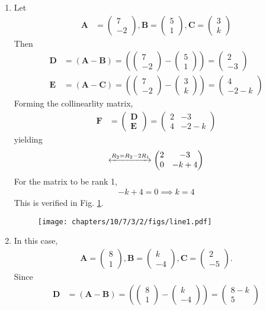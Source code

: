 \documentclass[journal,10pt,twocolumn]{article}
\newcommand{\myvec}[1]{\ensuremath{\begin{pmatrix}#1\end{pmatrix}}}
\let\vec\mathbf
\providecommand{\brak}[1]{\ensuremath{\left(#1\right)}}
\let\vec\mathbf
\begin{document}
\begin{enumerate}
\item 
Let
\begin{align}  
	\vec{A}&=\myvec{7 \\-2},
\vec{B}=\myvec{5 \\ 1},
\vec{C}=\myvec{3 \\ k}
\end{align}
Then
\begin{align}  
\vec{D} &=\brak{\vec{A}-\vec{B}} = \brak{\myvec{7 \\-2 } - \myvec{5 \\1 } } = \myvec{2 \\ -3 }\\
\vec{E} &= \brak{\vec{A}-\vec{C}} = \brak{\myvec{7 \\ -2 } - \myvec{3 \\k} } = \myvec{4 \\-2-k}
\end{align}
Forming the collinearlity matrix,
\begin{align}
\vec{F} &={\myvec{\vec{D}\\ \vec{E}}}
=
\myvec{
2 & -3
 \\
4 & -2-k 
}
\end{align}
yielding
\begin{align}
\label{eq:chapters/10/7/3/2/chem_balance_mat_row1}
 \xleftrightarrow[]{R_2 = R_2-2R_1}
\myvec{
2 & -3
\\
0 & -k+4
}
\end{align}
For the matrix to be rank 1, 
\begin{align}
 -k+4 =0
\implies k =4 
\end{align}
This is verified in Fig. 
	  \ref{fig:chapters/10/7/3/2/line1.pdf}.
\begin{figure}[H]
	  \centering 
	  \texttt{[image: chapters/10/7/3/2/figs/line1.pdf]}
	  \caption{}
	  \label{fig:chapters/10/7/3/2/line1.pdf}
	  \end{figure} 	 		  
%
 \item In this case,
\begin{align}  
\vec{A}=\myvec{8 \\ 1},
\vec{B}=\myvec{k \\ -4},
\vec{C}=\myvec{2 \\ -5}.
\end{align}
Since
\begin{align}  
 \vec{D} &=\brak{\vec{A}-\vec{B}} = \brak{\myvec{8 \\1 } - \myvec{k \\-4 } } = \myvec{8-k \\ 5 }\\

\end{align}
\end{enumerate}
\end{document}
